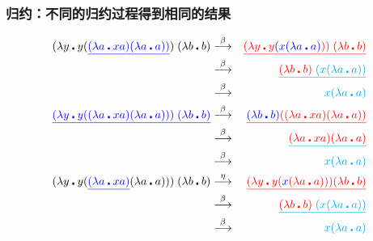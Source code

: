 \documentclass[CJKutf8,compress,hyperref]{beamer}
\begin{document}
\begin{CJK}{UTF8}{song}
\begin{frame}
  \frametitle{归约：不同的归约过程得到相同的结果} 
  \label{parad}
  \begin{eqnarray*}
    (\lambda y \centerdot y({\color{blue}\underline{(\lambda a \centerdot xa) (\lambda a \centerdot a))}})\;(\lambda b \centerdot b) & \stackrel{\beta}{\longrightarrow} & {\color{red}\underline{(\lambda y \centerdot y{\color{blue}(x (\lambda a \centerdot a)})) \; (\lambda b \centerdot b)}}   \\ 
                                                                                                                                     &  \stackrel{\beta}{\longrightarrow} & {\color{cyan}\underline{{\color{red}(\lambda b \centerdot b)}\;(x (\lambda a \centerdot a))}} \\
                                                                                                                                     & \stackrel{\beta}{\longrightarrow} & {\color{cyan}x(\lambda a \centerdot a)} \\
    {\color{blue}\underline{(\lambda y \centerdot y((\lambda a \centerdot xa) (\lambda a \centerdot a)))\;(\lambda b \centerdot b)}} & \stackrel{\beta}{\longrightarrow} & {\color{red}\underline{{\color{blue}(\lambda b \centerdot b)}((\lambda a \centerdot xa) (\lambda a \centerdot a))}}   \\ 
                                                                                                                                     &  \stackrel{\beta}{\longrightarrow} & {\color{cyan}\underline{{\color{red}(\lambda a \centerdot xa) (\lambda a \centerdot a)}}} \\
                                                                                                                                     & \stackrel{\beta}{\longrightarrow} & {\color{cyan}x(\lambda a \centerdot a)} \\
    (\lambda y \centerdot y({\color{blue}\underline{(\lambda a \centerdot xa)}} (\lambda a \centerdot a)))\;(\lambda b \centerdot b) &   \stackrel{\eta}{\longrightarrow} & {\color{red}\underline{(\lambda y \centerdot y ({\color{blue}x} (\lambda a \centerdot a))) (\lambda b \centerdot b)}}  \\   
                                                                                                                                     &  \stackrel{\beta}{\longrightarrow} & {\color{cyan}\underline{{\color{red}(\lambda b \centerdot b)}\;(x (\lambda a \centerdot a))}} \\
                                                                                                                                     & \stackrel{\beta}{\longrightarrow} & {\color{cyan}x(\lambda a \centerdot a)}
  \end{eqnarray*}
\end{frame}


\end{CJK}
\end{document}
